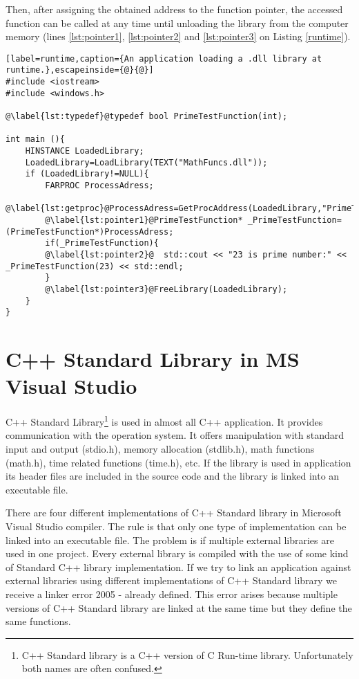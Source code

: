 Then, after assigning the obtained address to the function pointer, the accessed function can be called at any time until unloading the library from the computer memory (lines \ref{lst:pointer1}, \ref{lst:pointer2} and \ref{lst:pointer3} on Listing \ref{runtime}).

\begin{lstlisting}[label=runtime,caption={An application loading a .dll library at runtime.},escapeinside={@}{@}]
#include <iostream>
#include <windows.h>

@\label{lst:typedef}@typedef bool PrimeTestFunction(int);

int main (){
	HINSTANCE LoadedLibrary;
	LoadedLibrary=LoadLibrary(TEXT("MathFuncs.dll"));
	if (LoadedLibrary!=NULL){
		FARPROC ProcessAdress;
		@\label{lst:getproc}@ProcessAdress=GetProcAddress(LoadedLibrary,"PrimeTest");
		@\label{lst:pointer1}@PrimeTestFunction* _PrimeTestFunction=(PrimeTestFunction*)ProcessAdress;
		if(_PrimeTestFunction){
		@\label{lst:pointer2}@	std::cout << "23 is prime number:" << _PrimeTestFunction(23) << std::endl;
		}
		@\label{lst:pointer3}@FreeLibrary(LoadedLibrary);
	}
}
\end{lstlisting}



\section{C++ Standard Library in MS Visual Studio}

\label{standardlibrary}
C++ Standard Library\footnote{C++ Standard library is a C++ version of C Run-time library. Unfortunately both names are often confused.} is used in almost all C++ application. It provides communication with the operation system. It offers manipulation with standard input and output (stdio.h), memory allocation (stdlib.h), math functions (math.h), time related functions (time.h), etc. If the library is used in application its header files are included in the source code and the library is linked into an executable file.

There are four different implementations of C++ Standard library in Microsoft Visual Studio compiler. The rule is that only one type of implementation can be linked into an executable file. The problem is if multiple external libraries are used in one project. Every external library is compiled with the use of some kind of Standard C++ library implementation. If we try to link an application against external libraries using different implementations of C++ Standard library we receive a linker error 2005 - already defined. This error arises because multiple versions of C++ Standard library are linked at the same time but they define the same functions.

